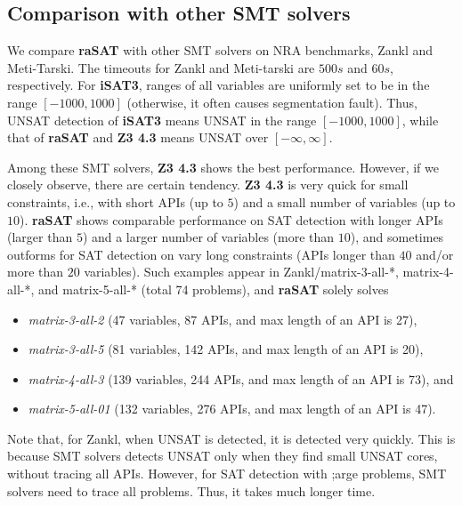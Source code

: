 \subsection{Comparison with other SMT solvers}

We compare {\bf raSAT} with other SMT solvers on NRA benchmarks, Zankl and Meti-Tarski. 
The timeouts for Zankl and Meti-tarski are $500s$ and $60s$, respectively. 
For {\bf iSAT3}, ranges of all variables are uniformly set to be in the range $[-1000, 1000]$
(otherwise, it often causes segmentation fault). 
Thus, UNSAT detection of {\bf iSAT3} means UNSAT in the range $[-1000, 1000]$, 
while that of {\bf raSAT} and {\bf Z3 4.3} means  UNSAT over $[-\infty, \infty]$. 

Among these SMT solvers, {\bf Z3 4.3} shows the best performance. 
However, if we closely observe, there are certain tendency. 
{\bf Z3 4.3} is very quick for small constraints, i.e., with 
short APIs (up to $5$) and a small number of variables (up to $10$). 
{\bf raSAT} shows comparable performance on SAT detection with 
longer APIs (larger than $5$) and a larger number of variables (more than $10$), 
and sometimes outforms for SAT detection on vary long constraints 
(APIs longer than $40$ and/or more than $20$ variables). 
Such examples appear in Zankl/matrix-3-all-*, matrix-4-all-*, and matrix-5-all-* 
(total 74 problems), and {\bf raSAT} solely solves 
\begin{itemize}
\item {\em matrix-3-all-2} (47 variables, 87 APIs, and max length of an API is 27), 
\item {\em matrix-3-all-5} (81 variables, 142 APIs, and max length of an API is 20), 
\item {\em matrix-4-all-3} (139 variables, 244 APIs, and max length of an API is 73), and 
\item {\em matrix-5-all-01} (132 variables, 276 APIs, and max length of an API is 47). 
\end{itemize}
Note that, for Zankl, when UNSAT is detected, it is detected very quickly. 
This is because SMT solvers detects UNSAT only when they find small UNSAT cores, 
without tracing all APIs. However, for SAT detection with ;arge problems, 
SMT solvers need to trace all problems. Thus, it takes much longer time. 

